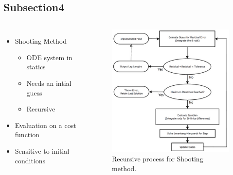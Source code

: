 \documentclass[compress]{thesisbeamer}
\begin{document}
		\subsection{Subsection4}
        \begin{frame}
			\begin{columns}
			\begin{itemize}%
  				\item Shooting Method
  				\begin{itemize}
  					\item ODE system in statics
  					\item Needs an intial guess
  					\item Recursive
  				\end{itemize}
  				\item Evaluation on a cost function
  				\item Sensitive to initial conditions
 			\end{itemize}
			\vspace{2cm}
			\begin{figure}[h]
				\centering
				\includegraphics[width=\textwidth]{images/sequence}
				\caption{Recursive process for Shooting method.}
			\end{figure}
			\end{columns}
		\end{frame}
		
\end{document}
